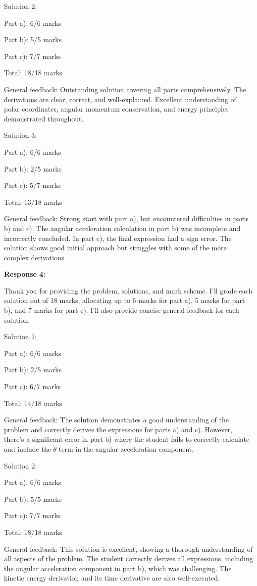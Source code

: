 \documentclass[a4paper,11pt]{article}
\begin{document}
Solution 2:

Part a): 6/6 marks

Part b): 5/5 marks

Part c): 7/7 marks

Total: 18/18 marks

General feedback: Outstanding solution covering all parts comprehensively. The derivations are clear, correct, and well-explained. Excellent understanding of polar coordinates, angular momentum conservation, and energy principles demonstrated throughout.

Solution 3:

Part a): 6/6 marks

Part b): 2/5 marks

Part c): 5/7 marks

Total: 13/18 marks

General feedback: Strong start with part a), but encountered difficulties in parts b) and c). The angular acceleration calculation in part b) was incomplete and incorrectly concluded. In part c), the final expression had a sign error. The solution shows good initial approach but struggles with some of the more complex derivations.

\bigskip
\textbf{Response 4:}

Thank you for providing the problem, solutions, and mark scheme. I'll grade each solution out of 18 marks, allocating up to 6 marks for part a), 5 marks for part b), and 7 marks for part c). I'll also provide concise general feedback for each solution.

Solution 1:

Part a): 6/6 marks

Part b): 2/5 marks

Part c): 6/7 marks

Total: 14/18 marks

General feedback: The solution demonstrates a good understanding of the problem and correctly derives the expressions for parts a) and c). However, there's a significant error in part b) where the student fails to correctly calculate and include the \(\ddot{\theta}\) term in the angular acceleration component.

Solution 2:

Part a): 6/6 marks

Part b): 5/5 marks

Part c): 7/7 marks

Total: 18/18 marks

General feedback: This solution is excellent, showing a thorough understanding of all aspects of the problem. The student correctly derives all expressions, including the angular acceleration component in part b), which was challenging. The kinetic energy derivation and its time derivative are also well-executed.
\end{document}
